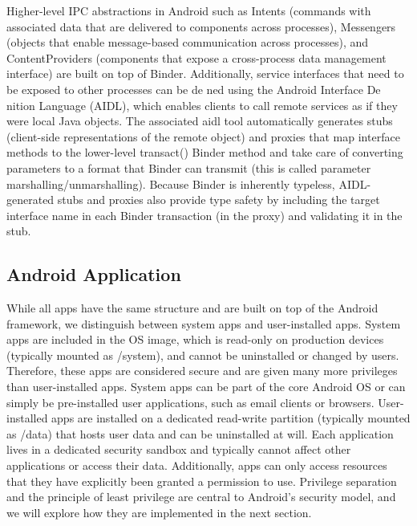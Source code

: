Higher-level IPC abstractions in Android such as Intents (commands with associated data that are delivered to components across processes), Messengers (objects that enable message-based communication across processes), and ContentProviders (components that expose a cross-process data management interface) are built on top of Binder. Additionally, service interfaces that need to be exposed to other processes can be de ned using the Android Interface De nition Language (AIDL), which enables clients to call remote services as if they were local Java objects. The associated aidl tool automatically generates stubs (client-side representations of the remote object) and proxies that map interface methods to the lower-level transact() Binder method and take care of converting parameters to a format that Binder can transmit (this is called parameter marshalling/unmarshalling). Because Binder is inherently typeless, AIDL-generated stubs and proxies also provide type safety by including the target interface name in each Binder transaction (in the proxy) and validating it in the stub.

\subsection*{Android Application} 

While all apps have the same structure and are built on top of the Android framework, we distinguish between system apps and user-installed apps. System apps are included in the OS image, which is read-only on production devices (typically mounted as /system), and cannot be uninstalled or changed by users. Therefore, these apps are considered secure and are given many more privileges than user-installed apps. System apps can be part of the core Android OS or can simply be pre-installed user applications, such as email clients or browsers. User-installed apps are installed on a dedicated read-write partition (typically mounted as /data) that hosts user data and can be uninstalled at will. Each application lives in a dedicated security sandbox and typically cannot affect other applications or access their data. Additionally, apps can only access resources that they have explicitly been granted a permission to use. Privilege separation and the principle of least privilege are central to Android’s security model, and we will explore how they are implemented in the next section. 


